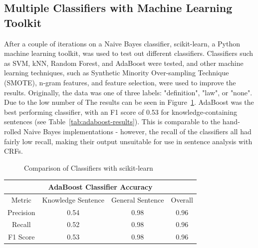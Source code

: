 \documentclass{article} %
\begin{document}
\subsection{Multiple Classifiers with Machine Learning Toolkit}

After a couple of iterations on a Naive Bayes classifier, scikit-learn, a Python machine learning toolkit, was used to test out different classifiers. Classifiers such as SVM, kNN, Random Forest, and AdaBoost were tested, and other machine learning techniques, such as Synthetic Minority Over-sampling Technique (SMOTE), n-gram features, and feature selection, were used to improve the results. Originally, the data was one of three labels: "definition", "law", or "none". Due to the low number of The results can be seen in Figure~\ref{fig:scikit-learn}. AdaBoost was the best performing classifier, with an F1 score of 0.53 for knowledge-containing sentences (see Table~\ref{tab:adaboost-results}). This is comparable to the hand-rolled Naive Bayes implementations - however, the recall of the classifiers all had fairly low recall, making their output unsuitable for use in sentence analysis with CRFs.

\begin{figure}[t]
\centering
{}
\caption{Comparison of Classifiers with scikit-learn}
\label{fig:scikit-learn}
\end{figure}

\begin{center}
 \label{tab:adaboost-results} 
\begin{tabular}{ |c||c|c|c| }
	\hline
	\multicolumn{4}{|c|}{AdaBoost Classifier Accuracy} \\
	\hline
	Metric & Knowledge Sentence & General Sentence & Overall \\
	\hline
	Precision & 0.54 & 0.98 & 0.96 \\
	Recall & 0.52 & 0.98 & 0.96 \\
	F1 Score & 0.53 & 0.98 & 0.96 \\
	\hline
\end{tabular}
\end{center}
\end{document}
